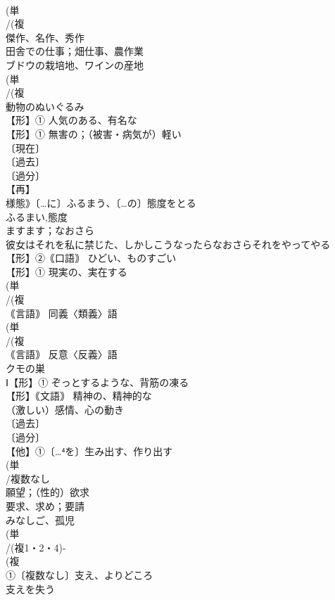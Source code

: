 \documentclass[8pt]{extreport}
\begin{document}
\begin{CJK}{UTF8}{min}
\\	(単
\\	/(複
\\	傑作、名作、秀作
\\	田舎での仕事；畑仕事、農作業
\\	ブドウの栽培地、ワインの産地
\\	(単
\\	/(複
\\	動物のぬいぐるみ
\\	【形】① 人気のある、有名な 
\\	【形】① 無害の；（被害・病気が）軽い 
\\	〔現在〕
\\	〔過去〕
\\	〔過分〕
\\	【再】
\\	様態》〔…に〕ふるまう、〔…の〕態度をとる 
\\	ふるまい,態度
\\	ますます；なおさら 
\\	彼女はそれを私に禁じた、しかしこうなったらなおさらそれをやってやる
\\	【形】②｟口語｠ ひどい、ものすごい
\\	【形】① 現実の、実在する 
\\	(単
\\	/(複
\\	｟言語｠ 同義〈類義〉語
\\	(単
\\	/(複
\\	｟言語｠ 反意〈反義〉語
\\	クモの巣
\\	Ⅰ【形】① ぞっとするような、背筋の凍る
\\	【形】｟文語｠ 精神の、精神的な
\\	（激しい）感情、心の動き
\\	〔過去〕
\\	〔過分〕
\\	【他】①〔…⁴を〕生み出す、作り出す
\\	(単
\\	/複数なし 
\\	願望；（性的）欲求 
\\	要求、求め；要請
\\	みなしご、孤児
\\	(単
\\	/(複1・2・4)-
\\	(複
\\	①〔複数なし〕支え、よりどころ 
\\	支えを失う

\end{CJK}
\end{document}
